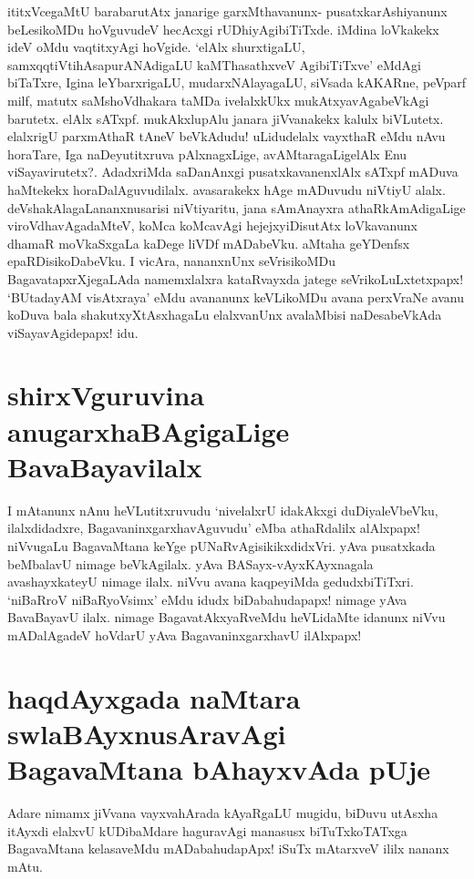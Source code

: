 ititxVcegaMtU barabarutAtx janarige garxMthavanunx- pusatxkarAshiyanunx beLesikoMDu hoVguvudeV hecAcxgi rUDhiyAgibiTiTxde. iMdina loVkakekx ideV oMdu  vaqtitxyAgi hoVgide. `elAlx shurxtigaLU, samxqqtiVtihAsapurANAdigaLU kaMThasathxveV AgibiTiTxve' eMdAgi biTaTxre, Igina leYbarxrigaLU, mudarxNAlayagaLU, siVsada kAKARne, peVparf milf, matutx saMshoVdhakara taMDa ivelalxkUkx mukAtxyavAgabeVkAgi barutetx. elAlx sATxpf. mukAkxlupAlu janara jiVvanakekx kalulx biVLutetx. elalxrigU parxmAthaR tAneV beVkAdudu! uLidudelalx vayxthaR eMdu nAvu horaTare, Iga naDeyutitxruva pAlxnagxLige, avAMtaragaLigelAlx Enu viSayavirutetx?. AdadxriMda saDanAnxgi pusatxkavanenxlAlx sATxpf mADuva haMtekekx horaDalAguvudilalx. avasarakekx hAge mADuvudu niVtiyU alalx. deVshakAlagaLananxnusarisi niVtiyaritu, jana sAmAnayxra athaRkAmAdigaLige viroVdhavAgadaMteV, koMca koMcavAgi hejejxyiDisutAtx loVkavanunx dhamaR moVkaSxgaLa kaDege liVDf mADabeVku. aMtaha geYDenfsx  epaRDisikoDabeVku. I vicAra, nananxnUnx seVrisikoMDu BagavatapxrXjegaLAda namemxlalxra kataRvayxda jatege seVrikoLuLxtetxpapx! `BUtadayAM visAtxraya'\label{115b} eMdu avananunx keVLikoMDu avana perxVraNe avanu koDuva bala shakutxyXtAsxhagaLu elalxvanUnx avalaMbisi naDesabeVkAda viSayavAgidepapx! idu.

\section*{shirxVguruvina anugarxhaBAgigaLige BavaBayavilalx}

I mAtanunx nAnu heVLutitxruvudu `nivelalxrU idakAkxgi duDiyaleVbeVku, ilalxdidadxre, BagavaninxgarxhavAguvudu' eMba athaRdalilx alAlxpapx! niVvugaLu BagavaMtana keYge pUNaRvAgisikikxdidxVri. yAva pusatxkada beMbalavU nimage beVkAgilalx. yAva BASayx-vAyxKAyxnagala avashayxkateyU nimage ilalx. niVvu avana kaqpeyiMda gedudxbiTiTxri. `niBaRroV niBaRyoV\s simx'\label{115} eMdu idudx biDabahudapapx! nimage yAva BavaBayavU ilalx. nimage BagavatAkxyaRveMdu heVLidaMte idanunx niVvu mADalAgadeV hoVdarU yAva BagavaninxgarxhavU ilAlxpapx!

\section*{haqdAyxgada naMtara swlaBAyxnusAravAgi BagavaMtana bAhayxvAda pUje}

Adare nimamx jiVvana vayxvahArada kAyaRgaLU mugidu, biDuvu utAsxha itAyxdi elalxvU kUDibaMdare haguravAgi manasusx biTuTxkoTATxga BagavaMtana kelasaveMdu mADabahudapApx! iSuTx mAtarxveV ililx nananx mAtu.

